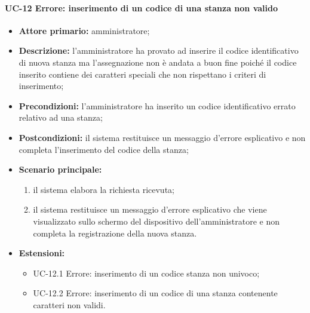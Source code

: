 \paragraph{UC-12 Errore: inserimento di un codice di una stanza non valido}
\begin{itemize}
	\item \textbf{Attore primario:} amministratore;
	\item \textbf{Descrizione:} l'amministratore ha provato ad inserire il codice identificativo di nuova stanza ma l'assegnazione non è andata a buon fine poiché il codice inserito contiene dei caratteri speciali che non rispettano i criteri di inserimento;
	\item \textbf{Precondizioni:} l'amministratore ha inserito un codice identificativo errato relativo ad una stanza;
	\item \textbf{Postcondizioni:} il sistema restituisce un messaggio d'errore esplicativo e non completa l'inserimento del codice della stanza;
	\item \textbf{Scenario principale:}
	      \begin{enumerate}
		      \item il sistema elabora la richiesta ricevuta;
		      \item il sistema restituisce un messaggio d'errore esplicativo che viene visualizzato sullo schermo del dispositivo dell'amministratore e non completa la registrazione della nuova stanza.
	      \end{enumerate}
	 \item \textbf{Estensioni:}
	 	\begin{itemize}
		       \item UC-12.1 Errore: inserimento di un codice stanza non univoco;
		       \item UC-12.2 Errore: inserimento di un codice di una stanza contenente caratteri non validi.
	        \end{itemize}
\end{itemize}

